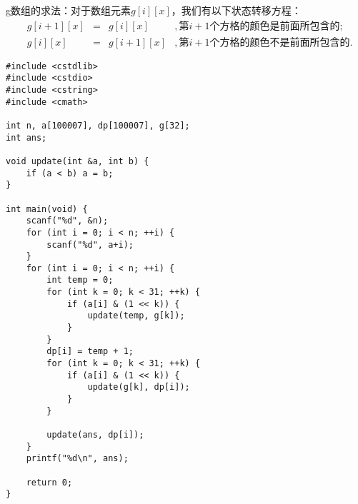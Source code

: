 \documentclass{article}
\begin{document}
g数组的求法：对于数组元素$g[i][x]$，我们有以下状态转移方程：
\begin{equation*}
    \begin{aligned}
        &g[i+1][x]&=&g[i][x]&,第i+1个方格的颜色是前面所包含的;\\
        &g[i][x]&=&g[i+1][x]&,第i+1个方格的颜色不是前面所包含的.
    \end{aligned}
\end{equation*}
\begin{verbatim}
#include <cstdlib>
#include <cstdio>
#include <cstring>
#include <cmath>

int n, a[100007], dp[100007], g[32];
int ans;

void update(int &a, int b) {
    if (a < b) a = b;
}

int main(void) {
    scanf("%d", &n);
    for (int i = 0; i < n; ++i) {
        scanf("%d", a+i);
    }
    for (int i = 0; i < n; ++i) {
        int temp = 0;
        for (int k = 0; k < 31; ++k) {
            if (a[i] & (1 << k)) {
                update(temp, g[k]);
            }
        }
        dp[i] = temp + 1;
        for (int k = 0; k < 31; ++k) {
            if (a[i] & (1 << k)) {
                update(g[k], dp[i]);
            }
        }

        update(ans, dp[i]);
    }
    printf("%d\n", ans);

    return 0;
}
\end{verbatim}
\end{document}
